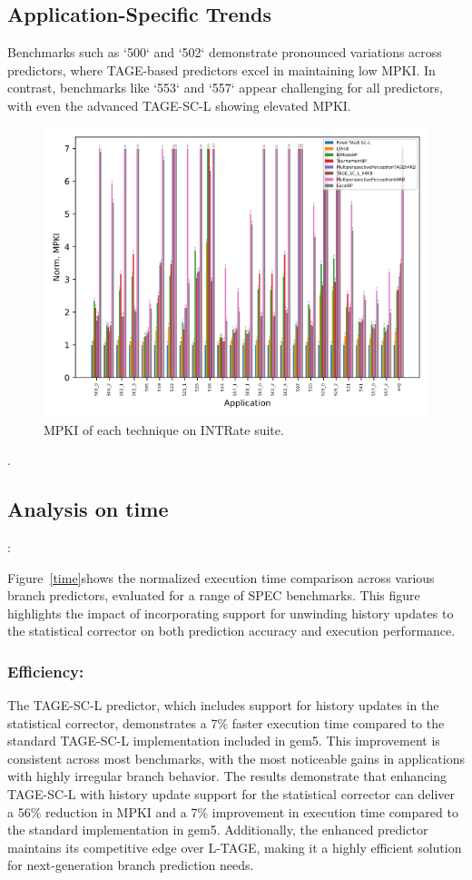 \documentclass[10pt,journal,compsoc]{IEEEtran}
\begin{document}
\subsection{Application-Specific Trends}
Benchmarks such as `500` and `502` demonstrate pronounced variations across predictors, where TAGE-based predictors excel in maintaining low MPKI. In contrast, benchmarks like `553` and `557` appear challenging for all predictors, with even the advanced TAGE-SC-L showing elevated MPKI.
\begin{figure}
    \centering
    \includegraphics[width=0.8\linewidth]{image.png}
    \caption{MPKI of each technique on INTRate suite.}\label{mpki}
\end{figure}.

\subsection*{Analysis on time}:

Figure~\ref{time}shows the normalized execution time comparison across various branch predictors, evaluated for a range of SPEC benchmarks. This figure highlights the impact of incorporating support for unwinding history updates to the statistical corrector on both prediction accuracy and execution performance.

\subsubsection*{Efficiency: }
The TAGE-SC-L predictor, which includes support for history updates in the statistical corrector, demonstrates a 7\% faster execution time compared to the standard TAGE-SC-L implementation included in gem5. This improvement is consistent across most benchmarks, with the most noticeable gains in applications with highly irregular branch behavior.
The results demonstrate that enhancing TAGE-SC-L with history update support for the statistical corrector can deliver a 56\% reduction in MPKI and a 7\% improvement in execution time compared to the standard implementation in gem5. Additionally, the enhanced predictor maintains its competitive edge over L-TAGE, making it a highly efficient solution for next-generation branch prediction needs.
\end{document}
